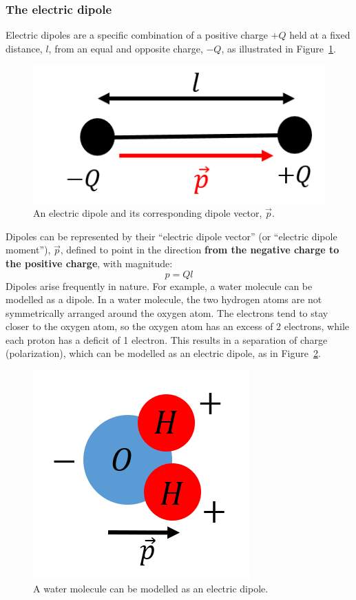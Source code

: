 \subsubsection{The electric dipole}\label{sec:chargesfields:electricdipole}

Electric dipoles are a specific combination of a positive charge $+Q$ held at a fixed distance, $l$, from an equal and opposite charge, $-Q$, as illustrated in Figure~\ref{fig:chargesfields:dipole}.

\begin{figure}[!htbp]
\centering
\includegraphics[width=0.3\linewidth]{files/dipole-46c3107dc981a624ca87141b9e165fa2.png}
\caption[]{An electric dipole and its corresponding dipole vector, $\vec p$.}
\label{fig:chargesfields:dipole}
\end{figure}

Dipoles can be represented by their ``electric dipole vector'' (or ``electric dipole moment''), $\vec p$, defined to point in the direction \textbf{from the negative charge to the positive charge}, with magnitude:
\begin{equation}
p=Ql
\end{equation}
Dipoles arise frequently in nature. For example, a water molecule can be modelled as a dipole. In a water molecule, the two hydrogen atoms are not symmetrically arranged around the oxygen atom. The electrons tend to stay closer to the oxygen atom, so the oxygen atom has an excess of 2 electrons, while each proton has a deficit of 1 electron. This results in a separation of charge (polarization), which can be modelled as an electric dipole, as in Figure~\ref{fig:chargesfields:h20}.

\begin{figure}[!htbp]
\centering
\includegraphics[width=0.2\linewidth]{files/h20-c9e951e5ea9119ebb1b2a21e09add397.png}
\caption[]{A water molecule can be modelled as an electric dipole.}
\label{fig:chargesfields:h20}
\end{figure}

